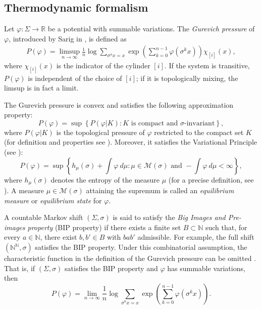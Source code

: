 \documentclass[letterpaper,11pt]{amsart}
\numberwithin{equation}{section}     %
\newcommand{\M}{\mathcal{M}}
\newcommand{\R}{\mathbb{R}}
\newcommand{\N}{\mathbb{N}}
\def\phi{\varphi}
\def\R{{\mathbb R}}
\def\N{{\mathbb N}}
\def\M{{\mathcal M}}
\def\M{\mathcal{M}}
\begin{document}
\subsection{Thermodynamic formalism} \label{sec:thm}


Let $\phi:\Sigma\to\R$ be a potential with summable variations. The \emph{Gurevich pressure} of $\phi$, introduced by Sarig in \cite{sa1}, is defined as
\begin{align*}\label{eq:press1}
P(\phi) = \limsup_{n \rightarrow \infty} \frac{1}{n} \log \sum_{\sigma^{n}x=x}  \exp \left(\sum_{k=0}^{n-1} \phi(\sigma^{k}x)\right) \chi_{[i]}(x),  
\end{align*}
where $ \chi_{[i]}(x)$ is the indicator of the cylinder $[i]$. If the system is transitive, $P(\phi)$ is independent of the choice of $[i]$; if it is topologically mixing, the limsup is in fact a limit. 

The Gurevich pressure  is convex  and satisfies the following approximation property:
$$P(\phi) = \sup \left\{ P(\phi|K) : K \textrm{ is compact and } \sigma\textrm{-invariant}\right\},$$ 
where $P(\phi| K)$ is the topological pressure of $\phi$ restricted to the compact set $K$ (for definition and properties see \cite[Chapter 9]{w}). Moreover, it satisfies the Variational Principle (see \cite{sa1, ijt}):
$$ P(\phi)= \sup \left\{ h_\mu(\sigma) + \int \phi \ d \mu : \mu \in \M(\sigma) \text{ and } - \int \phi \ d \mu < \infty \right\},  $$
where  $h_\mu(\sigma)$ denotes the entropy of the measure $\mu$ (for a precise definition, see \cite[Chapter 4]{w}). A measure $\mu \in \M(\sigma)$ attaining the supremum  is called an \emph{equilibrium measure} or \emph{equilibrium state}  for $\phi$.

A countable Markov shift $(\Sigma, \sigma)$ is said to satisfy the \emph{Big Images and Pre-images property} (BIP property)  if there exists a finite set $B \subset \N$ such that, for every $a \in \N$, there exist $b,b' \in B$ with  $bab'$  admissible. For example, the full shift $(\N^\N,\sigma)$  satisfies the BIP property. Under this combinatorial assumption, the characteristic function in the definition of the Gurevich pressure can be omitted \cite[Corollary 1]{sa3}. That is, if $(\Sigma, \sigma)$ satisfies the BIP property and $\phi$ has summable variations, then 
\begin{equation*}
P(\phi) = \lim_{n \rightarrow \infty} \frac{1}{n} \log \sum_{\sigma^{n}x=x}  \exp \left(\sum_{k=0}^{n-1} \phi(\sigma^{k}x)\right).\end{equation*}
\end{document}
